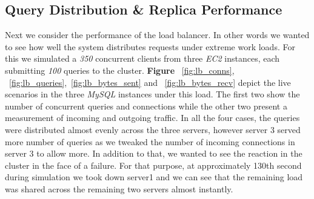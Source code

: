 \documentclass[12pt, twocolumn]{article}
\begin{document}
\subsection{Query Distribution \& Replica Performance}
Next we consider the performance of the load balancer. In other words we wanted to see how well the system distributes requests under extreme work loads. For this we simulated a \emph{350} concurrent clients from three \emph{EC2} instances, each submitting \emph{100} queries to the cluster. \textbf{Figure }~\ref{fig:lb_conns}, ~\ref{fig:lb_queries},~\ref{fig:lb_bytes_sent} and ~\ref{fig:lb_bytes_recv} depict the live scenarios in the three \emph{MySQL} instances under this load. The first two show the number of concurrent queries and connections while the other two present a measurement of incoming and outgoing traffic. In all the four cases, the queries were distributed almost evenly across the three servers, however server 3 served more number of queries as we tweaked the number of incoming connections in server 3 to allow more. In addition to that, we wanted to see the reaction in the cluster in the face of a failure. For that purpose, at approximately 130th second during simulation we took down server1 and we can see that the remaining load was shared across the remaining two servers almost instantly. 
\vspace{35mm}
\end{document}
